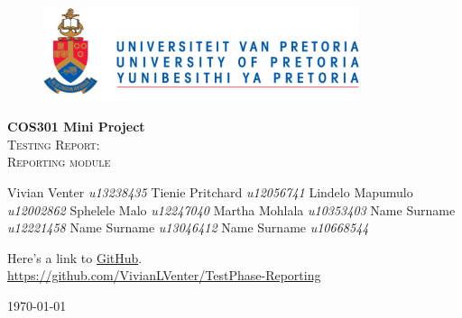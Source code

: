 \begin{titlepage}
	\begin{center}
		
		\begin{figure}[t]
			\centering
			\includegraphics[width=350px]{images/UP_Logo.png}
		\end{figure}
		
		\textbf{\Large COS301 Mini Project } \\
		\textsc{\Large Testing Report:  } \\
		\textsc{\Large Reporting module } \\
		
		\begin{flushright} \large
			Vivian Venter 		\emph{u13238435} \newline
			Tienie Pritchard 		\emph{u12056741} \newline
			Lindelo Mapumulo		\emph{u12002862} \newline
			Sphelele Malo 				\emph{u12247040} \newline
			Martha Mohlala 		\emph{u10353403} \newline
			Name Surname 		\emph{u12221458} \newline
			Name Surname 		\emph{u13046412} \newline
			Name Surname 		\emph{u10668544} \newline
		\end{flushright}
		
		\vfill
		
	Here's a link to \href{https://github.com/VivianLVenter/TestPhase-Reporting}{GitHub}.\\
	\url{https://github.com/VivianLVenter/TestPhase-Reporting}

	\vfill

	{\large \today}		
		
		
	\end{center}
\end{titlepage}
